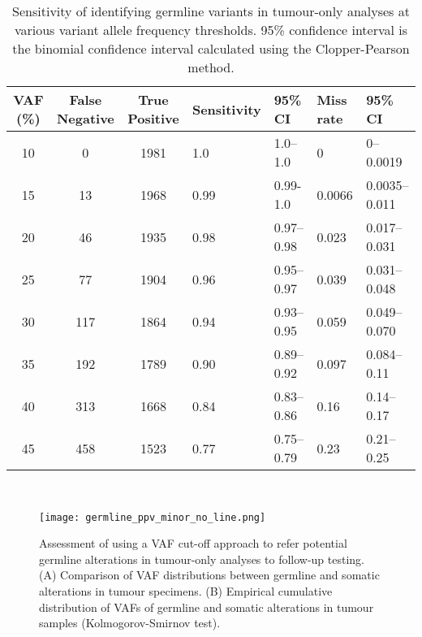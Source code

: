 \begin{table}[H]
\caption[Sensitivity of identifying germline variants in tumour-only analyses at various variant allele frequency thresholds.]{Sensitivity of identifying germline variants in tumour-only analyses at various variant allele frequency thresholds. 95\% confidence interval is the binomial confidence interval calculated using the Clopper-Pearson method.}
\label{tbl:sensitivity}
\centering
      \begin{tabular}{ccc|ll|ll}
        \hline
        VAF (\%) & False Negative & True Positive & Sensitivity & 95\% CI & Miss rate & 95\% CI
        \\
        \hline
        10 & 0 & 1981 & 1.0 & 1.0--1.0 & 0 & 0--0.0019
        \\
        15 & 13 & 1968 & 0.99 & 0.99-1.0 & 0.0066 & 0.0035--0.011
        \\
        20 & 46 & 1935 & 0.98 & 0.97--0.98 & 0.023 & 0.017--0.031
        \\
        25 & 77 & 1904 & 0.96 & 0.95--0.97 & 0.039 & 0.031--0.048
        \\
        30 & 117 & 1864 & 0.94 & 0.93--0.95 & 0.059 & 0.049--0.070
        \\
        35 & 192 & 1789 & 0.90 & 0.89--0.92 & 0.097 & 0.084--0.11
        \\
        40 & 313 & 1668 & 0.84 & 0.83--0.86 & 0.16 & 0.14--0.17
        \\
        45 & 458 & 1523 & 0.77 & 0.75--0.79 & 0.23 & 0.21--0.25
        \\
				\hline
      \end{tabular} \\
\end{table}


\begin{figure}[H]
	\texttt{[image: germline\_ppv\_minor\_no\_line.png]}
	\caption[Assessment of using a VAF cut-off approach to refer potential germline alterations in tumour-only analyses to follow-up testing.]{Assessment of using a VAF cut-off approach to refer potential germline alterations in tumour-only analyses to follow-up testing. (A) Comparison of VAF distributions between germline and somatic alterations in tumour specimens. (B) Empirical cumulative distribution of VAFs of germline and somatic alterations in tumour samples (Kolmogorov-Smirnov test).}
	\label{fig:germline_ppv_minor}
\end{figure}

